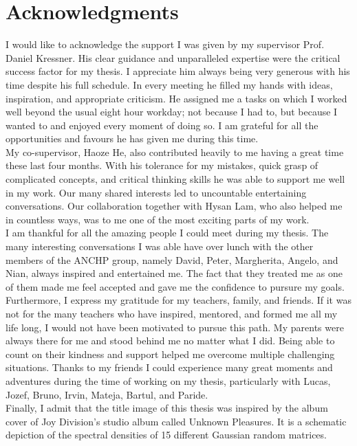 \chapter*{Acknowledgments}
\label{chp:0-acknowledgments}

I would like to acknowledge the support I was given by my supervisor
Prof. Daniel Kressner. His clear guidance and unparalleled expertise were the
critical success factor for my thesis. I appreciate him always being very generous
with his time despite his full schedule. In every meeting he filled my hands with
ideas, inspiration, and appropriate criticism. He assigned me a tasks on which
I worked well beyond the usual eight hour workday; not because I had to, but because
I wanted to and enjoyed every moment of doing so. I am grateful for all the
opportunities and favours he has given me during this time.\\

My co-supervisor, Haoze He, also contributed heavily to me having a great time
these last four months. With his tolerance for my mistakes, quick grasp of
complicated concepts, and critical thinking skills he was able to support me
well in my work. Our many shared interests led to uncountable
entertaining conversations. Our collaboration together with Hysan Lam, who
also helped me in countless ways, was to me one of the most exciting parts of
my work.\\

I am thankful for all the amazing people I could meet during my thesis.
The many interesting conversations I was able have over lunch with
the other members of the ANCHP group, namely David, Peter,
Margherita, Angelo, and Nian, always inspired and entertained me.
The fact that they treated me as one of them made me feel accepted and gave 
me the confidence to pursure my goals.\\

Furthermore, I express my gratitude for my teachers, family, and friends.
If it was not for the many teachers who have inspired, mentored, and formed me
all my life long, I would not have been motivated to pursue this path.
My parents were always there for me and stood behind me no matter what I did.
Being able to count on their kindness and support helped me overcome multiple
challenging situations. Thanks to my friends I could experience many great moments and adventures
during the time of working on my thesis, particularly with Lucas, Jozef, Bruno,
Irvin, Mateja, Bartul, and Paride.\\ 

Finally, I admit that the title image of this thesis was inspired
by the album cover of Joy Division's studio album called Unknown Pleasures.
It is a schematic depiction of the spectral densities of 15 different Gaussian random matrices.
